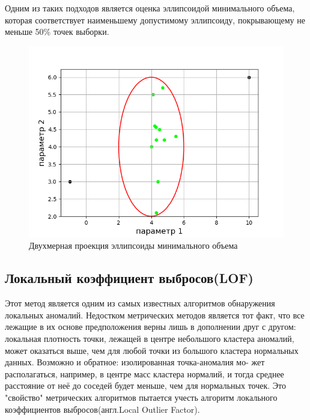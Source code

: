 Одним из таких подходов является оценка эллипсоидой минимального объема\cite{Book11}, которая соответствует наименьшему допустимому эллипсоиду, покрывающему не меньше 50\% точек выборки.
\begin{figure}
	\centering
	\includegraphics[width=.5\textwidth]{img/4.png}
	\caption{Двухмерная проекция эллипсоиды минимального объема}
	\label{fig04}
\end{figure}
\subsection{Локальный коэффициент выбросов(LOF)}
Этот метод является одним из самых известных алгоритмов обнаружения локальных аномалий. Недостком метрических методов является тот факт, что все лежащие в их основе предположения верны лишь в дополнении друг с другом: локальная плотность точки, лежащей в центре небольшого кластера аномалий, может оказаться выше, чем для любой точки из большого кластера
нормальных данных. Возможно и обратное: изолированная точка-аномалия мо-
жет располагаться, например, в центре масс кластера нормалий, и тогда среднее расстояние от неё до соседей будет меньше, чем для нормальных точек. Это "свойство" метрических алгоритмов пытается учесть алгоритм  локального коэффициентов выбросов(англ.Local Outlier Factor).

